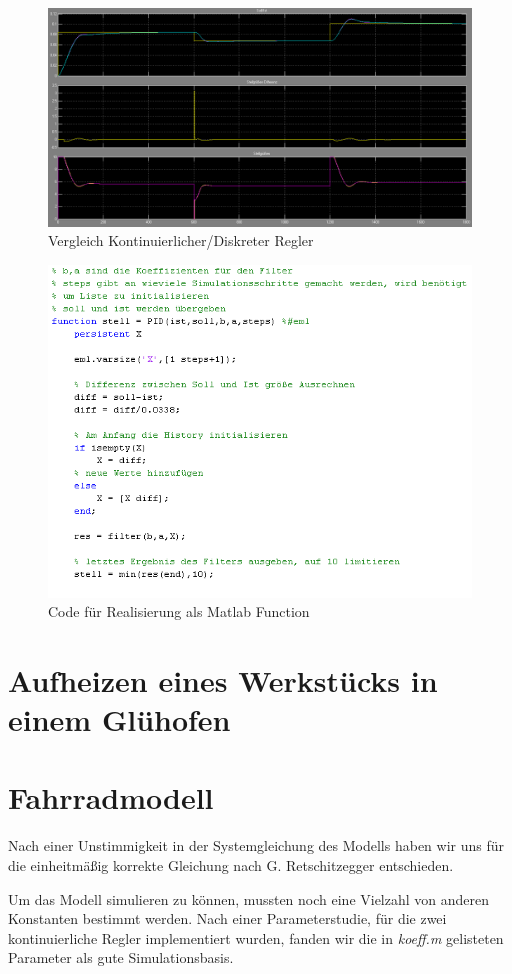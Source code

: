 \documentclass[a4paper]{article}
\begin{document}
\begin{figure}[ht!]
    \centering
    \includegraphics[width=\linewidth]{erg_bsp1.png}
    \caption{Vergleich Kontinuierlicher/Diskreter Regler}
    \label{fig:bsp1}
\end{figure}

\begin{figure}[ht!]
    \centering
    \includegraphics[width=\linewidth]{code_bsp1.png}
    \caption{Code für Realisierung als Matlab Function}
    \label{fig:bsp1_code}
\end{figure}

\section{Aufheizen eines Werkstücks in einem Glühofen}

\section{Fahrradmodell}

Nach einer Unstimmigkeit in der Systemgleichung des Modells haben wir uns für die einheitmäßig korrekte Gleichung nach G. Retschitzegger entschieden.

Um das Modell simulieren zu können, mussten noch eine Vielzahl von anderen Konstanten bestimmt werden. Nach einer Parameterstudie, für die zwei kontinuierliche Regler implementiert wurden, fanden wir die in \emph{koeff.m} gelisteten Parameter als gute Simulationsbasis.
\end{document}
